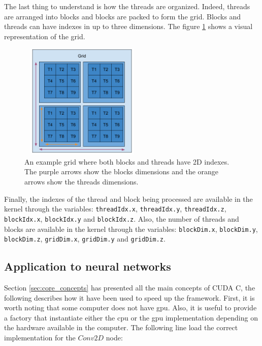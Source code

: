 \documentclass[11pt]{report}
\begin{document}
\noindent The last thing to understand is how the threads are organized. Indeed, threads are arranged into blocks and blocks are packed to form the grid. Blocks and threads can have indexes in up to three dimensions. The figure \ref{fig:grid} shows a visual representation of the grid.
\\

\begin{figure}[h]
\centering
\includegraphics[width=6cm, height=5.5cm]{grid}
\caption[Illustration of the GPU grid]{An example grid where both blocks and threads have 2D indexes. The purple arrows show the blocks dimensions and the orange arrows show the threads dimensions.}
\label{fig:grid}
\end{figure}

\noindent Finally, the indexes of the thread and block being processed are available in the kernel through the variables: \texttt{threadIdx.x}, \texttt{threadIdx.y}, \texttt{threadIdx.z}, \texttt{blockIdx.x}, \texttt{blockIdx.y} and \texttt{blockIdx.z}. Also, the number of threads and blocks are available in the kernel through the variables: \texttt{blockDim.x}, \texttt{blockDim.y}, \texttt{blockDim.z}, \texttt{gridDim.x}, \texttt{gridDim.y} and \texttt{gridDim.z}.

\subsection{Application to neural networks}

Section \ref{sec:core_concepts} has presented all the main concepts of CUDA C, the following describes how it have been used to speed up the framework. First, it is worth noting that some computer does not have \acrshort{gpu}. Also, it is useful to provide a factory that instantiate either the \acrshort{cpu} or the \acrshort{gpu} implementation depending on the hardware available in the computer. The following line load the correct implementation for the $Conv2D$ node:
\end{document}
